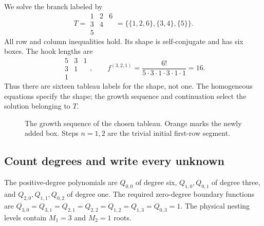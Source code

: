 \documentclass[11pt]{article}
\begin{document}
We solve the branch labeled by
\begin{equation}
 \label{eq:T321}
 T=\begin{array}{ccc}1&2&6\\3&4&\\5&&\end{array}
 =\{\{1,2,6\},\{3,4\},\{5\}\}.
\end{equation}
All row and column inequalities hold. Its shape is self-conjugate and
has six boxes. The hook lengths are
\[
 \begin{array}{ccc}5&3&1\\3&1&\\1&&\end{array},\qquad
 f^{(3,2,1)}=\frac{6!}{5\cdot3\cdot1\cdot3\cdot1\cdot1}=16.
\]
Thus there are sixteen tableau labels for the shape, not one. The
homogeneous equations specify the shape; the growth sequence and
continuation select the solution belonging to $T$.

\begin{figure}[htbp]
\centering
{}
\caption{The growth sequence of the chosen tableau. Orange marks the
newly added box. Steps $n=1,2$ are the trivial initial first-row segment.}
\label{fig:tableau-growth321}
\end{figure}

\subsection{Count degrees and write every unknown}

The positive-degree polynomials are $Q_{0,0}$ of degree six,
$Q_{1,0},Q_{0,1}$ of degree three, and $Q_{2,0},Q_{1,1},Q_{0,2}$ of
degree one. The required zero-degree boundary functions are
$Q_{3,0}=Q_{3,1}=Q_{2,1}=Q_{2,2}=Q_{1,2}=Q_{1,3}=Q_{0,3}=1$.
The physical nesting levels contain $M_1=3$ and $M_2=1$ roots.
\end{document}
